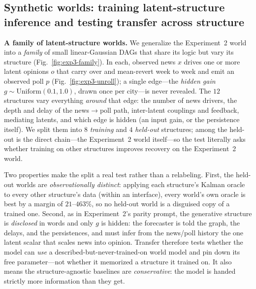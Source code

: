 \subsection{Synthetic worlds: training latent-structure inference and testing transfer across structure}
\label{sec:exp3-synthetic}



\textbf{A family of latent-structure worlds.}  We generalize the Experiment~2 world into a
\emph{family} of small linear-Gaussian DAGs that share its logic but vary its structure
(Fig.~\ref{fig:exp3-family}).  In each, observed news $x$ drives one or more latent opinions $o$ that
carry over and mean-revert week to week and emit an observed poll $p$ (Fig.~\ref{fig:exp3-unroll}); a
single edge---the \emph{hidden gain} $g\sim\mathrm{Uniform}(0.1,1.0)$, drawn once per city---is never
revealed.  The $12$ structures vary everything \emph{around} that edge: the number of news drivers, the
depth and delay of the news$\to$poll path, inter-latent couplings and feedback, mediating latents, and
which edge is hidden (an input gain, or the persistence itself).  We split them into $8$ \emph{training}
and $4$ \emph{held-out} structures; among the held-out is the direct chain---the Experiment~2 world
itself---so the test literally asks whether training on other structures improves recovery on the
Experiment~2 world.

Two properties make the split a real test rather than a relabeling. First, the held-out worlds are
\emph{observationally distinct}: applying each structure's Kalman oracle to every other structure's data
(within an interface), every world's own oracle is best by a margin of $21$--$463\%$, so no held-out
world is a disguised copy of a trained one. Second, as in Experiment~2's parity prompt, the generative
structure is \emph{disclosed} in words and only $g$ is hidden: the forecaster is told the graph, the
delays, and the persistences, and must infer from the news/poll history the one latent scalar that
scales news into opinion. Transfer therefore tests whether the model can \emph{use} a
described-but-never-trained-on world model and pin down its free parameter---not whether it memorized a
structure it trained on. It also means the structure-agnostic baselines are \emph{conservative}: the
model is handed strictly more information than they get.




